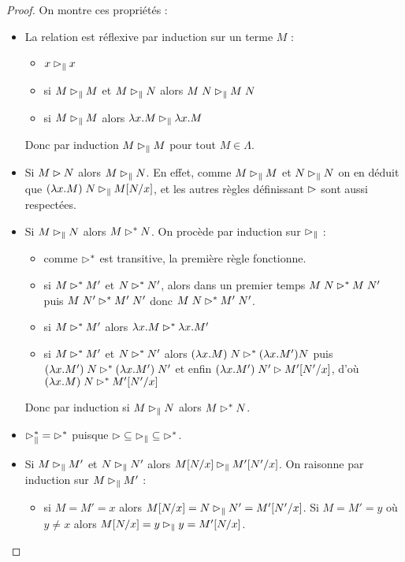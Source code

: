 \begin{proof}
    On montre ces propriétés :
    \begin{itemize}[label=$\bullet$]
        \item La relation est réflexive par induction sur un terme $M$ :
        \begin{itemize}[label=$\bullet$]
            \item $x\rhd_\| x$
            \item si $M\rhd_\| M$ et $M\rhd_\|N$ alors $M\;N\rhd_\|M\;N$
            \item si $M\rhd_\| M$ alors $\lambda x.M\rhd_\| \lambda x.M$
        \end{itemize}
        Donc par induction $M\rhd_\| M$ pour tout $M\in\Lambda$.
        \item Si $M\rhd N$ alors $M\rhd_\| N$. En effet, comme $M\rhd_\| M$ et $N\rhd_\| N$ on en déduit que $(\lambda x.M)\;N\rhd_\| M[N/x]$, et les autres règles définissant $\rhd$ sont aussi respectées.
        \item Si $M\rhd_\| N$ alors $M\rhd^* N$. On procède par induction sur $\rhd_\|$ :
        \begin{itemize}[label=$\bullet$]
            \item comme $\rhd^*$ est transitive, la première règle fonctionne.
            \item si $M\rhd^* M'$ et $N\rhd^* N'$, alors dans un premier temps $M\;N\rhd^*M\; N'$ puis $M\;N'\rhd^* M'\;N'$ donc $M\;N\rhd^* M'\;N'$.
            \item si $M\rhd^* M'$ alors $\lambda x.M\rhd^* \lambda x.M'$
            \item si $M\rhd^* M'$ et $N\rhd^* N'$ alors $(\lambda x.M)\;N\rhd^* (\lambda x.M')N$ puis $(\lambda x.M')\;N\rhd^* (\lambda x.M')\;N'$ et enfin $(\lambda x.M')\;N'\rhd M'[N'/x]$, d'où $(\lambda x.M)\;N\rhd^* M'[N'/x]$
        \end{itemize}
        Donc par induction si $M\rhd_\| N$ alors $M\rhd^* N$.
        \item $\rhd_\|^* = \rhd^*$ puisque $\rhd\subseteq \rhd_\|\subseteq \rhd^*$.
        \item Si $M\rhd_\| M'$ et $N\rhd_\| N'$ alors $M[N/x]\rhd_\| M'[N'/x]$. On raisonne par induction sur $M\rhd_\| M'$ :
        \begin{itemize}[label=$\bullet$]
            \item si $M=M'=x$ alors $M[N/x] = N\rhd_\| N' = M'[N'/x]$. Si $M=M'=y$ où $y\neq x$ alors $M[N/x] = y \rhd_\| y = M'[N/x]$.

\end{itemize}
\end{itemize}
\end{proof}
